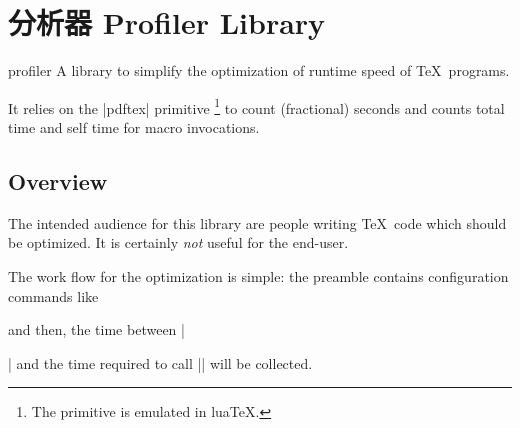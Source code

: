 %
%
%


\section{分析器 Profiler Library}

{}

\begin{pgflibrary}{profiler}
    A library to simplify the optimization of runtime speed of \TeX\ programs.

    It relies on the |pdftex| primitive
    \declareandlabel{\pdfelapsedtime}\footnote{The primitive is emulated in
    lua\TeX.} to count (fractional) seconds and counts total time and self time
    for macro invocations.
\end{pgflibrary}


\subsection{Overview}

The intended audience for this library are people writing \TeX\ code which
should be optimized. It is certainly \emph{not} useful for the end-user.

The work flow for the optimization is simple: the preamble contains
configuration commands like
%
\begin{codeexample}
\end{codeexample}
%
\noindent and then, the time between || and the time required to call |\pgfkeys| will be collected.

